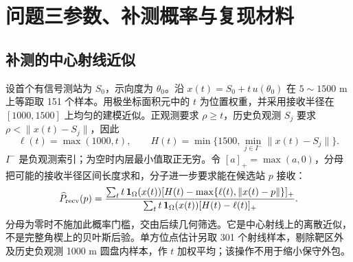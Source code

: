 \clearpage
\section{问题三参数、补测概率与复现材料}\label{app:q3repro}
\subsection{补测的中心射线近似}\label{app:q3prob}
设首个有信号测站为 $S_0$，示向度为 $\theta_0$。沿 $x(t)=S_0+t\,u(\theta_0)$ 在 $5\sim1500$ m 上等距取 151 个样本。用极坐标面积元中的 $t$ 为位置权重，并采用接收半径在 $[1000,1500]$ 上均匀的建模近似。正观测要求 $\rho\ge t$，历史负观测 $S_j$ 要求 $\rho<\|x(t)-S_j\|$，因此
\[
 \ell(t)=\max(1000,t),\qquad
 H(t)=\min\{1500,\min_{j\in I^-}\|x(t)-S_j\|\}.
\]
$I^-$ 是负观测索引；为空时内层最小值取正无穷。令 $[a]_+=\max(a,0)$，分母把可能的接收半径区间长度求和，分子进一步要求能在候选站 $p$ 接收：
\begin{equation}\label{eq:q3-prob}
 \widehat P_{\rm recv}(p)=
 \frac{\sum_t t\,\mathbf1_\Omega(x(t))
 [H(t)-\max\{\ell(t),\|x(t)-p\|\}]_+}
 {\sum_t t\,\mathbf1_\Omega(x(t))[H(t)-\ell(t)]_+}.
\end{equation}
分母为零时不施加此概率门槛，交由后续几何筛选。它是中心射线上的离散近似，不是完整角楔上的贝叶斯后验。单方位点估计另取 301 个射线样本，剔除靶区外及历史负观测 1000 m 圆盘内样本，作 $t$ 加权平均；该操作不用于缩小保守外包。

